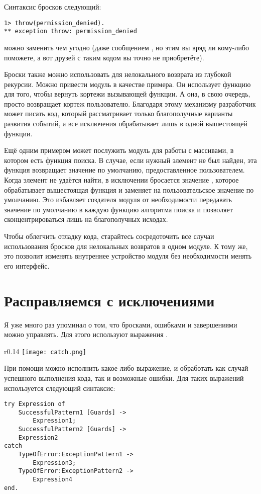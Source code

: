Синтаксис бросков следующий:
\begin{lstlisting}[style=erlang]
1> throw(permission_denied).
** exception throw: permission_denied
\end{lstlisting}
 можно заменить чем угодно (даже сообщением , но этим вы вряд ли кому-либо поможете, а вот друзей с таким кодом вы точно не приобретёте).

Броски также можно использовать для нелокального возврата из глубокой рекурсии.
Можно привести модуль  в качестве примера.
Он использует функцию  для того, чтобы вернуть кортежи  вызывающей функции.
А она, в свою очередь, просто возвращает кортеж пользователю.
Благодаря этому механизму разработчик может писать код, который рассматривает только благополучные варианты развития событий, а все исключения обрабатывает лишь в одной вышестоящей функции.

Ещё одним примером может послужить модуль для работы с массивами, в котором есть функция поиска.
В случае, если нужный элемент не был найден, эта функция возвращает значение по умолчанию, предоставленное пользователем.
Когда элемент не удаётся найти, в исключении бросается значение , которое обрабатывает вышестоящая функция и заменяет на пользовательское значение по умолчанию.
Это избавляет создателя модуля от необходимости передавать значение по умолчанию в каждую функцию алгоритма поиска и позволяет сконцентрироваться лишь на благополучных исходах.

Чтобы облегчить отладку кода, старайтесь сосредоточить все случаи использования бросков для нелокальных возвратов в одном модуле.
К тому же, это позволит изменять внутреннее устройство модуля без необходимости менять его интерфейс.
\section{Расправляемся с исключениями}
\label{dealing-with-exceptions}
Я уже много раз упоминал о том, что бросками, ошибками и завершениями можно управлять.
Для этого используют выражения .
\begin{wrapfigure}{r}{0.14\linewidth}
    \texttt{[image: catch.png]}
\end{wrapfigure}
При помощи  можно исполнить какое\--либо выражение, и обработать как случай успешного выполнения кода, так и возможные ошибки.
Для таких выражений используется следующий синтаксис:
\begin{lstlisting}[style=erlang]
try Expression of
    SuccessfulPattern1 [Guards] ->
        Expression1;
    SuccessfulPattern2 [Guards] ->
    Expression2
catch
    TypeOfError:ExceptionPattern1 ->
        Expression3;
    TypeOfError:ExceptionPattern2 ->
        Expression4
end.
\end{lstlisting}

